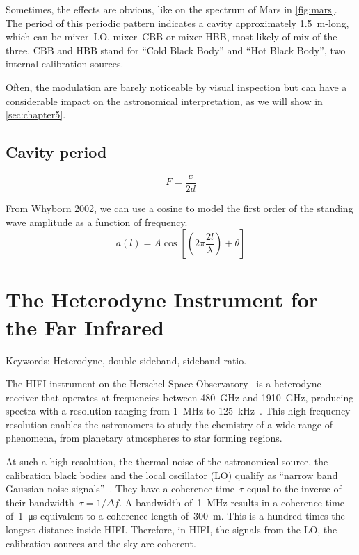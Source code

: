 Sometimes, the effects are obvious, like on the spectrum of Mars in \cref{fig:mars}.
The period of this periodic pattern indicates a cavity approximately \SI{1.5}{\meter}-long, which can be mixer--LO, mixer--CBB or mixer-HBB, most likely of mix of the three.
CBB and HBB stand for ``Cold Black Body'' and ``Hot Black Body'', two internal calibration sources.

Often, the modulation are barely noticeable by visual inspection but can have a considerable impact on the astronomical interpretation, as we will show in \cref{sec:chapter5}.


\subsection{Cavity period}
\begin{equation}
    F = \frac{c}{2d} \label{eq:cavity_period}
\end{equation}

From Whyborn 2002, we can use a cosine to model the first order of the standing wave amplitude as a function of frequency.
\begin{equation}
    a(l) = A \cos
    \left[
        \left(
            2 \pi \frac{2l}{\lambda}
        \right)
        + \theta
    \right]
\end{equation}


\section{The Heterodyne Instrument for the Far Infrared}

Keywords: Heterodyne, double sideband, sideband ratio.

The HIFI instrument on the Herschel Space Observatory~\cite{AA_518_L1} is a heterodyne receiver that operates at frequencies between \SI{480}{\giga\hertz} and \SI{1910}{\giga\hertz},
producing spectra with a resolution ranging from \SI{1}{\mega\hertz} to \SI{125}{\kilo\hertz}~\cite{AA_518_L6}.
This high frequency resolution enables the astronomers to study the chemistry of a wide range of phenomena, from planetary atmospheres to star forming regions.

At such a high resolution, the thermal noise of the astronomical source, the calibration black bodies and the local oscillator (LO) qualify as ``narrow band Gaussian noise signals''~\cite{siegman1986lasers}.
They have a coherence time~$\tau$ equal to the inverse of their bandwidth~$\tau=1/\Delta f$.
A bandwidth of~\SI{1}{\mega\hertz} results in a coherence time of~\SI{1}{\micro\second} equivalent to a coherence length of~\SI{300}{\meter}.
This is a hundred times the longest distance inside HIFI.
Therefore, in HIFI, the signals from the LO, the calibration sources and the sky are coherent.

